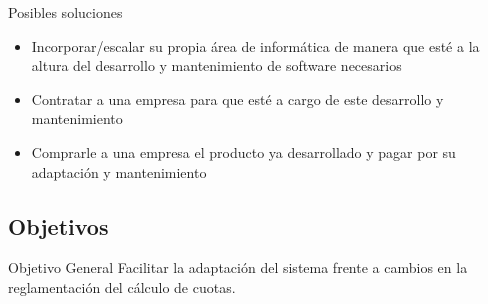 \documentclass[10pt]{beamer}
\begin{document}
\begin{frame}{Posibles soluciones}
    \begin{itemize}
        \item Incorporar/escalar su propia área de informática de manera que esté a la altura del desarrollo y mantenimiento de software necesarios
        \item Contratar a una empresa para que esté a cargo de este desarrollo y mantenimiento
        \item Comprarle a una empresa el producto ya desarrollado y pagar por su adaptación y mantenimiento
    \end{itemize}
\end{frame}

\subsection{Objetivos}

\begin{frame}{Objetivo General}
        Facilitar la adaptación del sistema frente a cambios en la reglamentación del cálculo de cuotas.
        
\end{frame}

\end{document}
